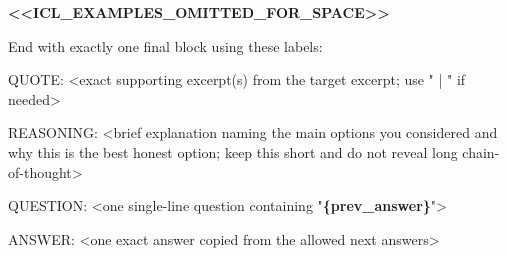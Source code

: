 \begin{tcolorbox}
\begin{scriptsize}
\mbox{}\par
\textcolor{my-green}{\textbf{\textless{}\textless{}ICL\_EXAMPLES\_OMITTED\_FOR\_SPACE\textgreater{}\textgreater{}}}\par
\mbox{}\par
End with exactly one final block using these labels:\par
QUOTE: \textless{}exact supporting excerpt(s) from the target excerpt; use " | " if needed\textgreater{}\par
REASONING: \textless{}brief explanation naming the main options you considered and why this is the best honest option; keep this short and do not reveal long chain-of-thought\textgreater{}\par
QUESTION: \textless{}one single-line question containing "\textcolor{my-green}{\textbf{\{prev\_answer\}}}"\textgreater{}\par
ANSWER: \textless{}one exact answer copied from the allowed next answers\textgreater{}\par
\end{scriptsize}
\end{tcolorbox}

